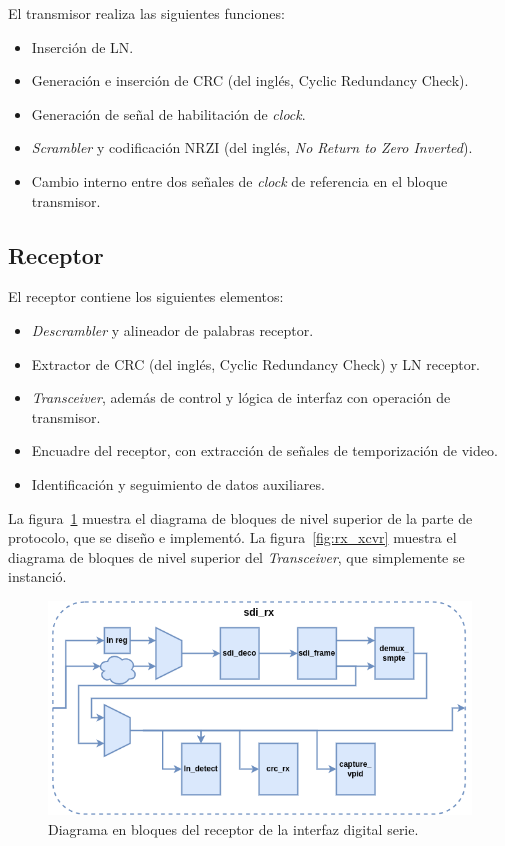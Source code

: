   El transmisor realiza las siguientes funciones:
  \begin{itemize}
      \item Inserción de LN\@.
      \item Generación e inserción de CRC  (del inglés, Cyclic Redundancy Check)\@.
      \item Generación de señal de habilitación de \textit{clock}.
      \item \textit{Scrambler} y codificación NRZI (del inglés, \textit{No Return to Zero Inverted}).
      \item Cambio interno entre dos señales de \textit{clock} de referencia en el bloque transmisor.
  \end{itemize}

\subsection{Receptor}

  El receptor contiene los siguientes elementos:
  \begin{itemize}
      \item \textit{Descrambler} y alineador de palabras receptor.
      \item Extractor de CRC  (del inglés, Cyclic Redundancy Check) y LN receptor.
      \item \textit{Transceiver}, además de control y lógica de interfaz con operación de transmisor.
      \item Encuadre del receptor, con extracción de señales de temporización de video.
      \item Identificación y seguimiento de datos auxiliares.
  \end{itemize}

  La figura~\ref{fig:sdi_rx} muestra el diagrama de bloques de nivel superior de
  la parte de protocolo, que se diseño e implementó. La figura~\ref{fig:rx_xcvr}
  muestra el diagrama de bloques de nivel superior del \textit{Transceiver}, que
  simplemente se instanció.

  \begin{figure}[htbp]
      \centering
      \includegraphics[width=\linewidth]{./Figures/sdi_rx.png}
      \caption{Diagrama en bloques del receptor de la interfaz digital serie.}\label{fig:sdi_rx}
  \end{figure}

